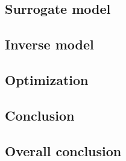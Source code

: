 \documentclass[12pt,a4paper,openright,twoside]{book}
\begin{document}
	\chapter{Surrogate model}
	
	
	\chapter{Inverse model}
	
	
	\chapter{Optimization}
	
	
	\chapter{Conclusion}
	
	
	\chapter{Overall conclusion}
	
	
	
	\backmatter
	
	\part*{}
	
	
	
	
\end{document}
